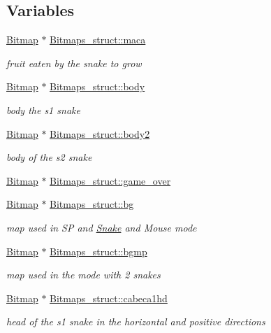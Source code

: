 \subsection*{Variables}
\begin{DoxyCompactItemize}
\item 
\hyperlink{structBitmap}{Bitmap} $\ast$ \hyperlink{group__graphics_ga90d36683bc99f1ee114191f6ae238990}{Bitmaps\+\_\+struct\+::maca}
\begin{DoxyCompactList}\small\item\em fruit eaten by the snake to grow \end{DoxyCompactList}\item 
\hyperlink{structBitmap}{Bitmap} $\ast$ \hyperlink{group__graphics_gaa22a993c184e8cd76dbdf4830e5d108e}{Bitmaps\+\_\+struct\+::body}
\begin{DoxyCompactList}\small\item\em body the s1 snake \end{DoxyCompactList}\item 
\hyperlink{structBitmap}{Bitmap} $\ast$ \hyperlink{group__graphics_ga8b84da2f75b89636fa34ff1cd47215f4}{Bitmaps\+\_\+struct\+::body2}
\begin{DoxyCompactList}\small\item\em body of the s2 snake \end{DoxyCompactList}\item 
\hyperlink{structBitmap}{Bitmap} $\ast$ \hyperlink{group__graphics_ga0145b28638489d1308f15646be8042eb}{Bitmaps\+\_\+struct\+::game\+\_\+over}
\item 
\hyperlink{structBitmap}{Bitmap} $\ast$ \hyperlink{group__graphics_ga2b3fa0b4fba818dec225a5cfa4ad2400}{Bitmaps\+\_\+struct\+::bg}
\begin{DoxyCompactList}\small\item\em map used in SP and \hyperlink{structSnake}{Snake} and Mouse mode \end{DoxyCompactList}\item 
\hyperlink{structBitmap}{Bitmap} $\ast$ \hyperlink{group__graphics_gaca55c5a5f1494cb6d6c872d072b501d1}{Bitmaps\+\_\+struct\+::bgmp}
\begin{DoxyCompactList}\small\item\em map used in the mode with 2 snakes \end{DoxyCompactList}\item 
\hyperlink{structBitmap}{Bitmap} $\ast$ \hyperlink{group__graphics_ga7740065d096144bd6f6f9457083584d9}{Bitmaps\+\_\+struct\+::cabeca1hd}
\begin{DoxyCompactList}\small\item\em head of the s1 snake in the horizontal and positive directions \end{DoxyCompactList}\item 

\end{DoxyCompactItemize}
